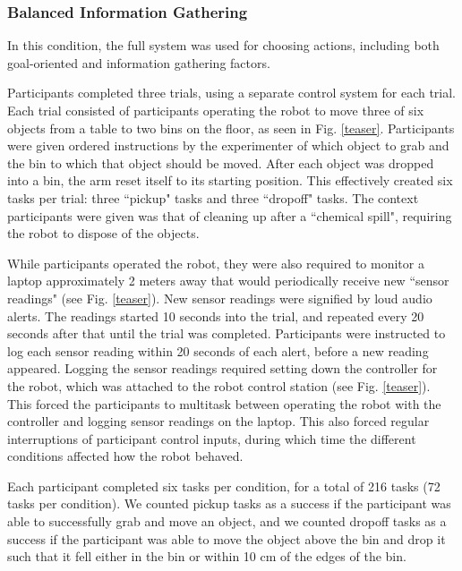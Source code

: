 \documentclass[conference]{IEEEtran}
\begin{document}
\subsubsection{Balanced Information Gathering}
In this condition, the full system was used for choosing actions, including both goal-oriented and information gathering factors.

Participants completed three trials, using a separate control system for each trial. Each trial consisted of participants operating the robot to move three of six objects from a table to two bins on the floor, as seen in Fig. \ref{teaser}. Participants were given ordered instructions by the experimenter of which object to grab and the bin to which that object should be moved. After each object was dropped into a bin, the arm reset itself to its starting position. This effectively created six tasks per trial: three ``pickup" tasks and three ``dropoff" tasks. The context participants were given was that of cleaning up after a ``chemical spill", requiring the robot to dispose of the objects.

While participants operated the robot, they were also required to monitor a laptop approximately 2 meters away that would periodically receive new ``sensor readings" (see Fig. \ref{teaser}). New sensor readings were signified by loud audio alerts. The readings started 10 seconds into the trial, and repeated every 20 seconds after that until the trial was completed. Participants were instructed to log each sensor reading within 20 seconds of each alert, before a new reading appeared. Logging the sensor readings required setting down the controller for the robot, which was attached to the robot control station (see Fig. \ref{teaser}). This forced the participants to multitask between operating the robot with the controller and logging sensor readings on the laptop. This also forced regular interruptions of participant control inputs, during which time the different conditions affected how the robot behaved.

Each participant completed six tasks per condition, for a total of 216 tasks (72 tasks per condition). We counted pickup tasks as a success if the participant was able to successfully grab and move an object, and we counted dropoff tasks as a success if the participant was able to move the object above the bin and drop it such that it fell either in the bin or within 10 cm of the edges of the bin.
\end{document}
